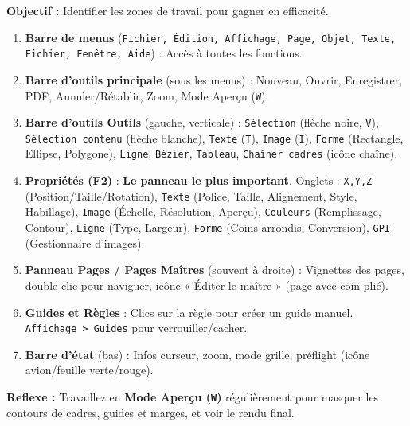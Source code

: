 \documentclass[11pt]{article}
\begin{document}
\begin{methode}
    \textbf{Objectif :} Identifier les zones de travail pour gagner en efficacité.
    \begin{enumerate}
        \item \textbf{Barre de menus} (\texttt{Fichier, Édition, Affichage, Page, Objet, Texte, Fichier, Fenêtre, Aide}) : Accès à toutes les fonctions.
        \item \textbf{Barre d'outils principale} (sous les menus) : Nouveau, Ouvrir, Enregistrer, PDF, Annuler/Rétablir, Zoom, Mode Aperçu (\texttt{W}).
        \item \textbf{Barre d'outils Outils} (gauche, verticale) : \texttt{Sélection} (flèche noire, \texttt{V}), \texttt{Sélection contenu} (flèche blanche), \texttt{Texte} (\texttt{T}), \texttt{Image} (\texttt{I}), \texttt{Forme} (Rectangle, Ellipse, Polygone), \texttt{Ligne}, \texttt{Bézier}, \texttt{Tableau}, \texttt{Chaîner cadres} (icône chaîne).
        \item \textbf{Propriétés (F2)} : \textbf{Le panneau le plus important}. Onglets : \texttt{X,Y,Z} (Position/Taille/Rotation), \texttt{Texte} (Police, Taille, Alignement, Style, Habillage), \texttt{Image} (Échelle, Résolution, Aperçu), \texttt{Couleurs} (Remplissage, Contour), \texttt{Ligne} (Type, Largeur), \texttt{Forme} (Coins arrondis, Conversion), \texttt{GPI} (Gestionnaire d'images).
        \item \textbf{Panneau Pages / Pages Maîtres} (souvent à droite) : Vignettes des pages, double-clic pour naviguer, icône « Éditer le maître » (page avec coin plié).
        \item \textbf{Guides et Règles} : Clics sur la règle pour créer un guide manuel. \texttt{Affichage > Guides} pour verrouiller/cacher.
        \item \textbf{Barre d'état} (bas) : Infos curseur, zoom, mode grille, préflight (icône avion/feuille verte/rouge).
    \end{enumerate}
    \textbf{Reflexe :} Travaillez en \textbf{Mode Aperçu (\texttt{W})} régulièrement pour masquer les contours de cadres, guides et marges, et voir le rendu final.
\end{methode}
\end{document}
